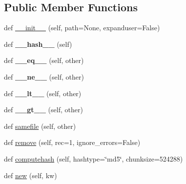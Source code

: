 \subsection*{Public Member Functions}
\begin{DoxyCompactItemize}
\item 
def \hyperlink{classpy_1_1__path_1_1local_1_1_local_path_a84171a8017450af601b0adb2d37705fe}{\+\_\+\+\_\+init\+\_\+\+\_\+} (self, path=None, expanduser=False)
\item 
\mbox{\label{classpy_1_1__path_1_1local_1_1_local_path_a52f7837232bd105ae27cd7cad45a1b66}} 
def {\bfseries \+\_\+\+\_\+hash\+\_\+\+\_\+} (self)
\item 
\mbox{\label{classpy_1_1__path_1_1local_1_1_local_path_a6d9e4abb7434958f3189065f3f2ed71c}} 
def {\bfseries \+\_\+\+\_\+eq\+\_\+\+\_\+} (self, other)
\item 
\mbox{\label{classpy_1_1__path_1_1local_1_1_local_path_a9e769b3834fd2e383c1b975c03c1c7bc}} 
def {\bfseries \+\_\+\+\_\+ne\+\_\+\+\_\+} (self, other)
\item 
\mbox{\label{classpy_1_1__path_1_1local_1_1_local_path_a6b8d039b1b103423c82be453b186c418}} 
def {\bfseries \+\_\+\+\_\+lt\+\_\+\+\_\+} (self, other)
\item 
\mbox{\label{classpy_1_1__path_1_1local_1_1_local_path_adeae49d5b26500f69d893eba79070be8}} 
def {\bfseries \+\_\+\+\_\+gt\+\_\+\+\_\+} (self, other)
\item 
def \hyperlink{classpy_1_1__path_1_1local_1_1_local_path_a07b02a65db0ae9b93e9611097e5e31d2}{samefile} (self, other)
\item 
def \hyperlink{classpy_1_1__path_1_1local_1_1_local_path_a7d620282a5d34284a50b14458236c339}{remove} (self, rec=1, ignore\+\_\+errors=False)
\item 
def \hyperlink{classpy_1_1__path_1_1local_1_1_local_path_a254f6d3e85e5813395e1ddc2e500fa2e}{computehash} (self, hashtype=\char`\"{}md5\char`\"{}, chunksize=524288)
\item 
def \hyperlink{classpy_1_1__path_1_1local_1_1_local_path_af28cfff4089f170f9819bfc0da9512cf}{new} (self, kw)

\end{DoxyCompactItemize}
